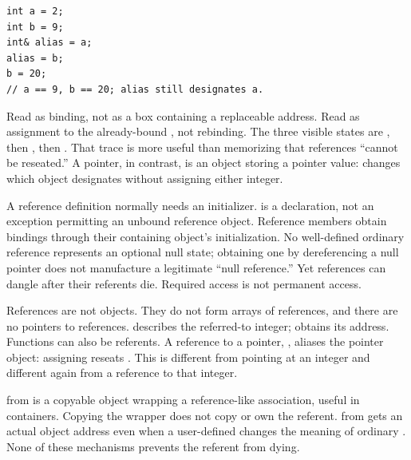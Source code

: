 \begin{verbatim}
int a = 2;
int b = 9;
int& alias = a;
alias = b;
b = 20;
// a == 9, b == 20; alias still designates a.
\end{verbatim}

Read  as binding, not as a box containing a replaceable address. Read  as assignment to the already-bound , not rebinding. The three visible states are , then , then . That trace is more useful than memorizing that references ``cannot be reseated.'' A pointer, in contrast, is an object storing a pointer value:  changes which object  designates without assigning either integer.

A reference definition normally needs an initializer.  is a declaration, not an exception permitting an unbound reference object. Reference members obtain bindings through their containing object's initialization. No well-defined ordinary reference represents an optional null state; obtaining one by dereferencing a null pointer does not manufacture a legitimate ``null reference.'' Yet references can dangle after their referents die. Required access is not permanent access.

References are not objects. They do not form arrays of references, and there are no pointers to references.  describes the referred-to integer;  obtains its address. Functions can also be referents. A reference to a pointer, , aliases the pointer object: assigning  reseats . This is different from  pointing at an integer and different again from a reference to that integer.

 from  is a copyable object wrapping a reference-like association, useful in containers. Copying the wrapper does not copy or own the referent.  from  gets an actual object address even when a user-defined  changes the meaning of ordinary . None of these mechanisms prevents the referent from dying.

